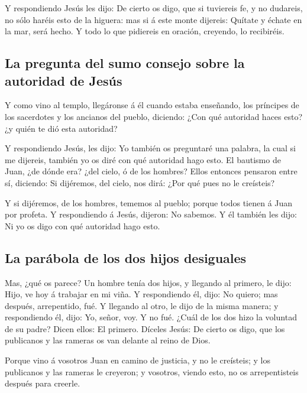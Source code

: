 Y respondiendo Jesús les dijo: De cierto os digo, que si
tuviereis fe, y no dudareis, no sólo haréis esto de la higuera: mas si á
este monte dijereis: Quítate y échate en la mar, será hecho.
 Y todo lo que pidiereis en oración, creyendo, lo
recibiréis.

\hypertarget{la-pregunta-del-sumo-consejo-sobre-la-autoridad-de-jesuxfas}{%
\subsection{La pregunta del sumo consejo sobre la autoridad de
Jesús}\label{la-pregunta-del-sumo-consejo-sobre-la-autoridad-de-jesuxfas}}

 Y como vino al templo, llegáronse á él cuando estaba
enseñando, los príncipes de los sacerdotes y los ancianos del pueblo,
diciendo: ¿Con qué autoridad haces esto? ¿y quién te dió esta autoridad?

 Y respondiendo Jesús, les dijo: Yo también os preguntaré
una palabra, la cual si me dijereis, también yo os diré con qué
autoridad hago esto.  El bautismo de Juan, ¿de dónde era?
¿del cielo, ó de los hombres? Ellos entonces pensaron entre sí,
diciendo: Si dijéremos, del cielo, nos dirá: ¿Por qué pues no le
creísteis?

 Y si dijéremos, de los hombres, tememos al pueblo; porque
todos tienen á Juan por profeta.  Y respondiendo á Jesús,
dijeron: No sabemos. Y él también les dijo: Ni yo os digo con qué
autoridad hago esto.

\hypertarget{la-paruxe1bola-de-los-dos-hijos-desiguales}{%
\subsection{La parábola de los dos hijos
desiguales}\label{la-paruxe1bola-de-los-dos-hijos-desiguales}}

 Mas, ¿qué os parece? Un hombre tenía dos hijos, y llegando
al primero, le dijo: Hijo, ve hoy á trabajar en mi viña.  Y
respondiendo él, dijo: No quiero; mas después, arrepentido, fué.
 Y llegando al otro, le dijo de la misma manera; y
respondiendo él, dijo: Yo, señor, voy. Y no fué.  ¿Cuál de
los dos hizo la voluntad de su padre? Dicen ellos: El primero. Díceles
Jesús: De cierto os digo, que los publicanos y las rameras os van
delante al reino de Dios.

 Porque vino á vosotros Juan en camino de justicia, y no le
creísteis; y los publicanos y las rameras le creyeron; y vosotros,
viendo esto, no os arrepentisteis después para creerle.

